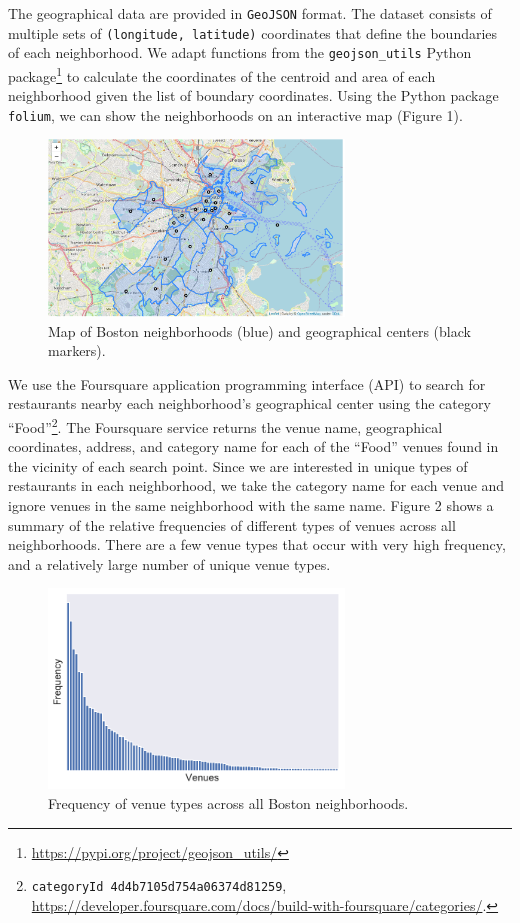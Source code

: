 \documentclass[11pt, a4paper]{article} %
\begin{document}
The geographical data are provided in \texttt{GeoJSON} format.
The dataset consists of multiple sets of \texttt{(longitude, latitude)} coordinates that define the boundaries of each neighborhood.
We adapt functions from the \texttt{geojson\_utils} Python package\footnote{\url{https://pypi.org/project/geojson_utils/}} to calculate the coordinates of the centroid and area of each neighborhood given the list of boundary coordinates.
Using the Python package \texttt{folium}, we can show the neighborhoods on an interactive map (Figure 1).

\begin{figure}
\begin{center}
\includegraphics[width=0.7\textwidth]{folium_map.png}
\end{center}
\caption{Map of Boston neighborhoods (blue) and geographical centers (black markers).}
\end{figure}

We use the Foursquare application programming interface (API) to search for restaurants nearby each neighborhood's geographical center using the category ``Food''\footnote{\texttt{categoryId 4d4b7105d754a06374d81259}, \url{https://developer.foursquare.com/docs/build-with-foursquare/categories/}.}.
The Foursquare service returns the venue name, geographical coordinates, address, and category name for each of the ``Food'' venues found in the vicinity of each search point.
Since we are interested in unique types of restaurants in each neighborhood, we take the category name for each venue and ignore venues in the same neighborhood with the same name.
Figure 2 shows a summary of the relative frequencies of different types of venues across all neighborhoods. 
There are a few venue types that occur with very high frequency, and a relatively large number of unique venue types.

\begin{figure}
\begin{center}
\includegraphics[width=0.7\textwidth]{summary_bar.pdf}
\end{center}
\caption{Frequency of venue types across all Boston neighborhoods.}
\end{figure}





\end{document}
